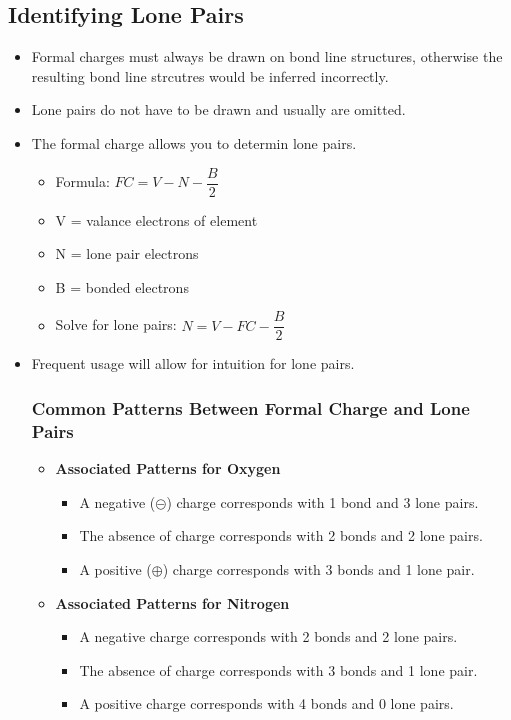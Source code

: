 \documentclass[12pt,a4paper]{article}
\begin{document}
\subsection{Identifying Lone Pairs}
\begin{itemize}
    \item Formal charges must always be drawn on bond line structures, otherwise the resulting bond line strcutres would be inferred incorrectly.
    \item Lone pairs do not have to be drawn and usually are omitted.
    \item The formal charge allows you to determin lone pairs.
        \begin{itemize}
            \item Formula: \(FC = V - N - \dfrac{B}{2}\)
            \item V = valance electrons of element
            \item N = lone pair electrons
            \item B = bonded electrons
            \item Solve for lone pairs: {\color{o-Sun}\(N = V - FC - \dfrac{B}{2}\)}
        \end{itemize}
    \item Frequent usage will allow for intuition for lone pairs.
    \newpage
    \subsubsection{Common Patterns Between Formal Charge and Lone Pairs}
    \begin{itemize}
        \item \textbf{Associated Patterns for Oxygen}
            \begin{itemize}
                \item A {\color{neg}negative ($\circleddash$)} charge corresponds with {\color{o-Sun}1 bond} and {\color{o-Sun}3 lone pairs}.
                \item The {\color{G-Moon}absence} of charge corresponds with {\color{o-Sun}2 bonds} and {\color{o-Sun}2 lone pairs}.
                \item A {\color{pos}positive ($\oplus$)} charge corresponds with {\color{o-Sun}3 bonds} and {\color{o-Sun}1 lone pair}.
            \end{itemize}
        \item \textbf{Associated Patterns for Nitrogen}
            \begin{itemize}
                \item A {\color{neg}negative} charge corresponds with {\color{o-Sun}2 bonds} and {\color{o-Sun}2 lone pairs}.
                \item The {\color{G-Moon}absence} of charge corresponds with {\color{o-Sun}3 bonds} and {\color{o-Sun}1 lone pair}.
                \item A {\color{pos}positive} charge corresponds with {\color{o-Sun}4 bonds} and {\color{o-Sun}0 lone pairs}.
            \end{itemize}
    \end{itemize}
\end{itemize}
\end{document}
